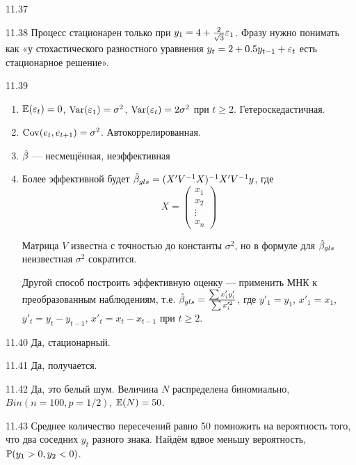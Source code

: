 \protect \hypertarget {soln:11.37}{}
\begin{solution}{{11.37}}

\end{solution}
\protect \hypertarget {soln:11.38}{}
\begin{solution}{{11.38}}
Процесс стационарен только при $y_1=4+\frac{2}{\sqrt{3}}\e_1$. Фразу нужно понимать как «у стохастического разностного уравнения $y_t=2+0.5y_{t-1}+\e_t$ есть стационарное решение».
\end{solution}
\protect \hypertarget {soln:11.39}{}
\begin{solution}{{11.39}}
\begin{enumerate}
\item $\E(\e_t)=0$, $\Var(\e_1)=\sigma^2$, $\Var(\e_t)=2\sigma^2$ при $t\geq 2$.  Гетероскедастичная.
\item $\Cov(e_t,e_{t+1})=\sigma^2$. Автокоррелированная.
\item $\hb$ — несмещённая, неэффективная
\item Более эффективной будет $\hb_{gls}=(X'V^{-1}X)^{-1}X'V^{-1}y$, где
\[
X=\begin{pmatrix}
x_1 \\
x_2 \\
\vdots \\
x_n
\end{pmatrix}
\]

Матрица $V$ известна с точностью до константы $\sigma^2$, но в формуле для $\hb_{gls}$ неизвестная $\sigma^2$ сократится.

Другой способ построить эффективную оценку — применить МНК к преобразованным наблюдениям, т.е. $\hb_{gls}=\frac{\sum x'_i y'_i}{\sum x_i^{\prime 2}}$, где $y'_1=y_1$, $x'_1=x_1$, $y'_t=y_t-y_{t-1}$, $x'_t=x_t-x_{t-1}$ при $t\geq 2$.
\end{enumerate}
\end{solution}
\protect \hypertarget {soln:11.40}{}
\begin{solution}{{11.40}}
Да, стационарный.
\end{solution}
\protect \hypertarget {soln:11.41}{}
\begin{solution}{{11.41}}
Да, получается.
\end{solution}
\protect \hypertarget {soln:11.42}{}
\begin{solution}{{11.42}}
Да, это белый шум. Величина $N$ распределена биномиально, $Bin(n=100,p=1/2)$, $\E(N)=50$.
\end{solution}
\protect \hypertarget {soln:11.43}{}
\begin{solution}{{11.43}}
Среднее количество пересечений равно 50 помножить на вероятность того, что два соседних $y_t$ разного знака. Найдём вдвое меньшу вероятность, $\P(y_1>0, y_2 <0)$.
\end{solution}
